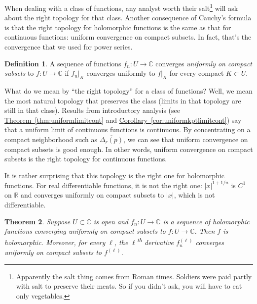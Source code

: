 \documentclass[12pt,openany]{book}
\newcommand{\sabs}[1]{\lvert {#1} \rvert}
\newcommand{\C}{{\mathbb{C}}}
\newcommand{\R}{{\mathbb{R}}}
\newcommand{\myindex}[1]{#1\index{#1}}
\newcommand{\myquote}[1]{``#1''}
\theoremstyle{plain}
\newtheorem{thm}{Theorem}[section]
\theoremstyle{remark}
\theoremstyle{definition}
\newtheorem{defn}[thm]{Definition}
\theoremstyle{exercise}
\theoremstyle{example}
\newcommand{\thmref}[1]{\hyperref[#1]{Theorem~\ref*{#1}}}
\newcommand{\corref}[1]{\hyperref[#1]{Corollary~\ref*{#1}}}
\begin{document}
When dealing with a class of functions, any analyst worth their
salt\footnote{Apparently the salt thing
comes from Roman times.  Soldiers were
paid partly with salt to preserve their meats.  So if you didn't ask,
you will have to eat only vegetables.} will ask about the right topology for
that class.
Another consequence of Cauchy's formula is that the right topology for
holomorphic functions is the same as that for continuous functions: uniform
convergence on compact subsets.  In fact, that's the convergence that we
used for power series.

\begin{defn}
A sequence of functions $f_n \colon U \to \C$ converges
\emph{\myindex{uniformly on compact subsets}}%
to $f \colon U \to \C$ if
$f_n|_K$ converges uniformly to $f|_K$
for every compact $K \subset U$.
\end{defn}

What do we mean by \myquote{the right topology} for a class of functions?
Well, we mean the most natural
topology that preserves the class (limits in that topology are still in that
class).  
Results from introductory analysis
(see \thmref{thm:uniformlimitcont} and \corref{cor:uniformkptlimitcont})
say that a uniform limit of continuous functions is continuous.
By concentrating on a compact neighborhood such as $\overline{\Delta_r(p)}$,
we can see that uniform convergence on compact subsets is good enough.
In other words, uniform convergence on compact subsets is the right topology
for continuous functions.

It is rather surprising that this topology is the right one for holomorphic
functions.  For real
differentiable functions, it is not the right one: $\sabs{x}^{1+1/n}$
is $C^1$ on $\R$ and converges uniformly on compact subsets to $\sabs{x}$,
which is not differentiable.

\begin{thm} \label{thm:unifoncompact}
Suppose $U \subset \C$ is open and $f_n \colon U \to \C$ is a sequence
of holomorphic functions converging uniformly on compact subsets to
$f \colon U \to \C$.  Then $f$ is holomorphic.
Moreover, for every $\ell$, the $\ell$\textsuperscript{th} derivative
$f_n^{(\ell)}$ converges uniformly on compact subsets to $f^{(\ell)}$.
\end{thm}
\end{document}
